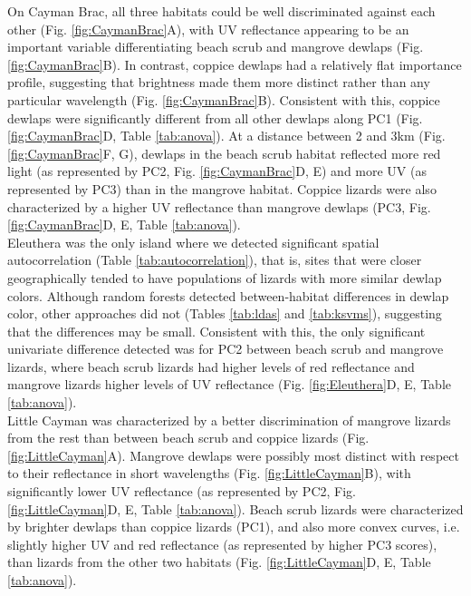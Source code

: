 On Cayman Brac, all three habitats could be well discriminated against each other (Fig. \ref{fig:CaymanBrac}A), with UV reflectance appearing to be an important variable differentiating beach scrub and mangrove dewlaps (Fig. \ref{fig:CaymanBrac}B). In contrast, coppice dewlaps had a relatively flat importance profile, suggesting that brightness made them more distinct rather than any particular wavelength (Fig. \ref{fig:CaymanBrac}B). Consistent with this, coppice dewlaps were significantly different from all other dewlaps along PC1 (Fig. \ref{fig:CaymanBrac}D, Table \ref{tab:anova}). At a distance between 2 and 3km (Fig. \ref{fig:CaymanBrac}F, G), dewlaps in the beach scrub habitat reflected more red light (as represented by PC2, Fig. \ref{fig:CaymanBrac}D, E) and more UV (as represented by PC3) than in the mangrove habitat. Coppice lizards were also characterized by a higher UV reflectance than mangrove dewlaps (PC3, Fig. \ref{fig:CaymanBrac}D, E, Table \ref{tab:anova}).\\

Eleuthera was the only island where we detected significant spatial autocorrelation (Table \ref{tab:autocorrelation}), that is, sites that were closer geographically tended to have populations of lizards with more similar dewlap colors. Although random forests detected between-habitat differences in dewlap color, other approaches did not (Tables \ref{tab:ldas} and \ref{tab:ksvms}), suggesting that the differences may be small. Consistent with this, the only significant univariate difference detected was for PC2 between beach scrub and mangrove lizards, where beach scrub lizards had higher levels of red reflectance and mangrove lizards higher levels of UV reflectance (Fig. \ref{fig:Eleuthera}D, E, Table \ref{tab:anova}).\\

Little Cayman was characterized by a better discrimination of mangrove lizards from the rest than between beach scrub and coppice lizards (Fig. \ref{fig:LittleCayman}A). Mangrove dewlaps were possibly most distinct with respect to their reflectance in short wavelengths (Fig. \ref{fig:LittleCayman}B), with significantly lower UV reflectance (as represented by PC2, Fig. \ref{fig:LittleCayman}D, E, Table \ref{tab:anova}). Beach scrub lizards were characterized by brighter dewlaps than coppice lizards (PC1), and also more convex curves, i.e. slightly higher UV and red reflectance (as represented by higher PC3 scores), than lizards from the other two habitats (Fig. \ref{fig:LittleCayman}D, E, Table \ref{tab:anova}).\\

